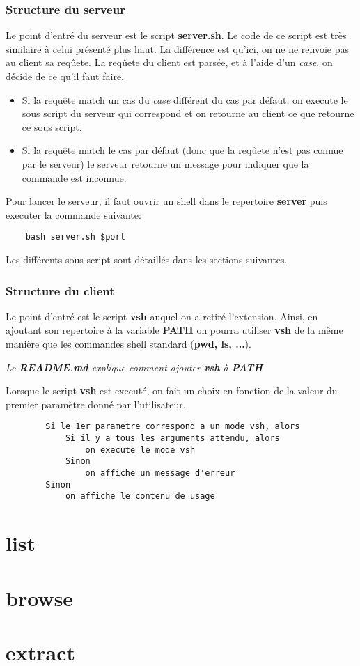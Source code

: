 \documentclass[titlepage]{article}
\begin{document}
	\subsubsection{Structure du serveur}
	Le point d'entré du serveur est le script \textbf{server.sh}. Le code de ce script est très similaire à celui présenté plus haut. La différence est qu'ici, on ne ne renvoie pas au client sa reqûete. La reqûete du client est parsée, et à l'aide d'un \textit{case}, on décide de ce qu'il faut faire.
	\begin{itemize}  
		\item Si la requête match un cas du \textit{case} différent du cas par défaut, on execute le sous script du serveur qui correspond et on retourne au client ce que retourne ce sous script.
		\item Si la requête match le cas par défaut (donc que la reqûete n'est pas connue par le serveur) le serveur retourne un message pour indiquer que la commande est inconnue.
	\end{itemize}

	Pour lancer le serveur, il faut ouvrir un shell dans le repertoire \textbf{server} puis executer la commande suivante:

	\begin{lstlisting}
	bash server.sh $port
	\end{lstlisting}

	Les différents sous script sont détaillés dans les sections suivantes.

	\subsubsection{Structure du client}
	Le point d'entré est le script \textbf{vsh} auquel on a retiré l'extension. Ainsi, en ajoutant son repertoire à la variable \textbf{PATH} on pourra utiliser \textbf{vsh} de la même manière que les commandes shell standard (\textbf{pwd, ls, ...}). 

	\textit{Le \textbf{README.md} explique comment ajouter \textbf{vsh} à \textbf{PATH}}

	Lorsque le script \textbf{vsh} est executé, on fait un choix en fonction de la valeur du premier paramètre donné par l'utilisateur.
	\begin{lstlisting}
		Si le 1er parametre correspond a un mode vsh, alors
			Si il y a tous les arguments attendu, alors
				on execute le mode vsh
			Sinon
				on affiche un message d'erreur
		Sinon
			on affiche le contenu de usage
	\end{lstlisting}

	\section{list}

	\section{browse}

	\section{extract}
\end{document}
